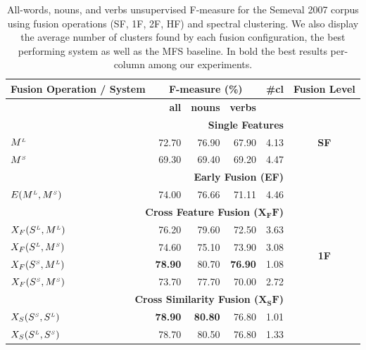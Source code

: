\begin{table}[htp!]
\centering
\setlength\tabcolsep{3pt}
\caption{All-words, nouns, and verbs unsupervised F-measure for the Semeval 2007 corpus using fusion operations (SF, 1F, 2F, HF) and spectral clustering. We also display the average number of clusters found by each fusion configuration, the best performing system as well as the MFS baseline. In bold the best results per-column among our experiments.}
\label{tab:wsd-semeval_unsup_fm}
\begin{tabular}{@{}lrrrrc@{}}
\toprule
\textbf{Fusion Operation / System} & \multicolumn{3}{c}{\textbf{F-measure (\%)}} & \#\textbf{cl} & \textbf{Fusion Level}\\ \midrule
      	& \textbf{all}          & \textbf{nouns}          & \textbf{verbs}           \\ 
       \midrule
       \multicolumn{5}{r}{\textbf{Single Features}} & \multirow{3}{*}{\textbf{SF}}\\ %
       $M^{\scriptscriptstyle L}$                    &	72.70	 & 76.90 & 67.90 & 4.13\\
 

       $M^{\scriptscriptstyle S}$                    &	69.30	& 69.40 & 69.20 & 4.47\\
       \midrule
       \multicolumn{5}{r}{\textbf{Early Fusion (EF)}}  & \multirow{10}{*}{\textbf{1F}}     \\ %
       $E(M^{\scriptscriptstyle L}, M^{\scriptscriptstyle S})$		&	74.00	& 76.66 & 71.11 & 4.46\\
       \multicolumn{5}{r}{\textbf{Cross Feature Fusion ($\mathbf{X_FF}$)}}       \\ %
	   
	   $X_F(S^{\scriptscriptstyle L}, M^{\scriptscriptstyle L})$		&	76.20	& 79.60 & 72.50 & 3.63 \\	   
       $X_F(S^{\scriptscriptstyle L}, M^{\scriptscriptstyle S})$		&	74.60	& 75.10 & 73.90 & 3.08 \\
	   $X_F(S^{\scriptscriptstyle S}, M^{\scriptscriptstyle L})$		&	\textbf{78.90}	& 80.70 & \textbf{76.90}	 & 1.08 \\	   
       $X_F(S^{\scriptscriptstyle S}, M^{\scriptscriptstyle S})$		&	73.70	& 77.70 & 70.00 & 2.72 \\       
       \multicolumn{5}{r}{\textbf{Cross Similarity Fusion ($\mathbf{X_SF}$)}}       \\ %
	   
 
	   $X_S(S^{\scriptscriptstyle S}, S^{\scriptscriptstyle L})$		&	\textbf{78.90}	& \textbf{80.80} & 76.80 & 1.01 \\
	   $X_S(S^{\scriptscriptstyle L}, S^{\scriptscriptstyle S})$		&	78.70	& 80.50  & 76.80 & 1.33 \\
	  

\end{tabular}
\end{table}
